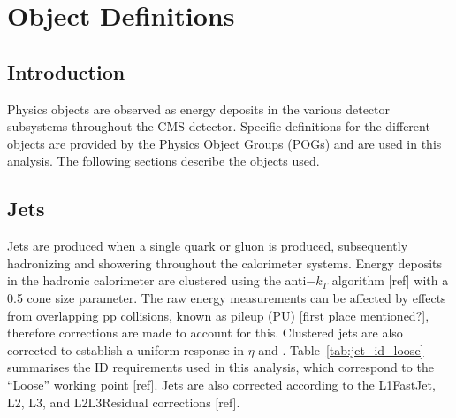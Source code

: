 \chapter{Object Definitions}

\ifpdf
    \graphicspath{{Chapter4/Figs/Raster/}{Chapter4/Figs/PDF/}{Chapter4/Figs/}}
\else
    \graphicspath{{Chapter4/Figs/Vector/}{Chapter4/Figs/}}
\fi


\section{Introduction}  %
\label{sec:objects_introduction}

Physics objects are observed as energy deposits in the various detector 
subsystems throughout the CMS detector. Specific definitions for the different 
objects are provided by the Physics Object Groups (POGs) and are used in this 
analysis. The following sections describe the objects used.


\section{Jets}  %
\label{sec:objects_jets}

Jets are produced when a single quark or gluon is produced, subsequently 
hadronizing and showering throughout the calorimeter systems. Energy deposits in
the hadronic calorimeter are clustered using the anti$-k_T$ algorithm [ref] with
a 0.5 cone size parameter. The raw energy measurements can be affected by 
effects from overlapping pp collisions, known as pileup (PU) [first place 
mentioned?], therefore corrections are made to account for this. Clustered jets 
are also corrected to establish a uniform response in $\eta$ and \Pt.
Table~\ref{tab:jet_id_loose} summarises the ID requirements used in this 
analysis, which correspond to the ``Loose'' working point [ref]. Jets are also 
corrected according to the L1FastJet, L2, L3, and L2L3Residual corrections [ref].

